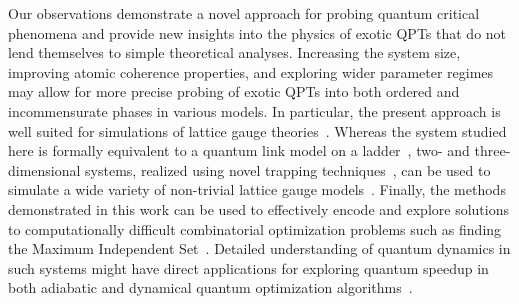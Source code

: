 \documentclass[prl,nobalancelastpage,superscriptaddress,twocolumn,nofootinbib]{revtex4}
\begin{document}
Our observations demonstrate a novel approach for probing quantum critical phenomena and provide new insights into the physics of exotic QPTs that do not lend themselves to simple theoretical analyses. 
Increasing the system size, improving atomic coherence properties, and exploring wider parameter regimes may allow for more precise probing of exotic QPTs into both ordered and incommensurate phases \cite{Ostlund1981,Fendley2004,Samajdar2018,Chepiga2018} in various models. In particular, the present approach is well suited for simulations of lattice gauge theories~\cite{Weimer2010_b}.  Whereas the system studied here is formally equivalent 
to a quantum link model on a ladder~\cite{Moessner2001},   two- and three-dimensional  systems, realized  using novel trapping techniques~\cite{Barredo2018, Kumar2018}, can be used to simulate a wide variety of non-trivial lattice gauge models~\cite{Tagliacozzo2013}.  
Finally, the methods demonstrated  in this work can be used to effectively encode and explore solutions to computationally difficult combinatorial optimization  problems such as finding the Maximum Independent Set~\cite{Pichler2018}. Detailed understanding of quantum dynamics in such systems might have direct applications for exploring quantum speedup in both adiabatic and dynamical quantum optimization algorithms~\cite{Farhi2000}.  

\FloatBarrier
\renewcommand{\addcontentsline}[3]{}
\end{document}
